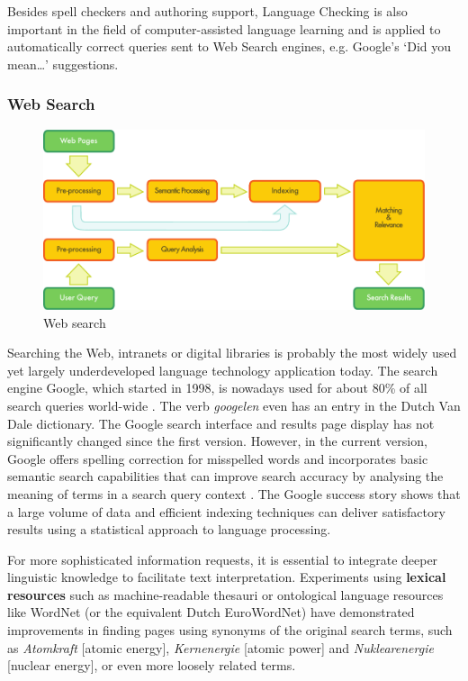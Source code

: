 \documentclass[]{../../metanetpaper}
\begin{document}
\begin{multicols}{2}
    Besides spell checkers and authoring support, Language Checking is also important in the field of computer-assisted language learning and is applied to automatically correct queries sent to Web Search engines, e.g. Google's `Did you mean\dots' suggestions.


\subsubsection{Web Search}

\begin{figure}[htb]
  \center
  \includegraphics[width=\textwidth]{../_media/english/web_search_architecture}
  \caption{Web search}
  \label{fig:websearcharch_en}
 \end{figure}

Searching the Web, intranets or digital libraries is probably the most widely used yet largely underdeveloped language technology application today. The search engine Google, which started in 1998, is nowadays used for about 80\% of all search queries world-wide \cite{Spiegel}. The verb \textit{googelen} even has an entry in the Dutch Van Dale dictionary. The Google search interface and results page display has not significantly changed since the first version. However, in the current version, Google offers spelling correction for misspelled words and incorporates basic semantic search capabilities that can improve search accuracy by analysing the meaning of terms in a search query context \cite{pc1}. The Google success story shows that a large volume of data and efficient indexing techniques can deliver satisfactory results using a statistical approach to language processing.

For more sophisticated information requests, it is essential to integrate deeper linguistic knowledge to facilitate text interpretation. Experiments using \textbf{lexical resources} such as machine-readable thesauri or ontological language resources like WordNet (or the equivalent Dutch EuroWordNet) have demonstrated improvements in finding pages using synonyms of the original search terms, such as \textit{Atomkraft} {[}atomic energy{]}, \textit{Kernenergie} {[}atomic power{]} and \textit{Nuklearenergie} {[}nuclear energy{]}, or even more loosely related terms.


\end{multicols}
\end{document}
